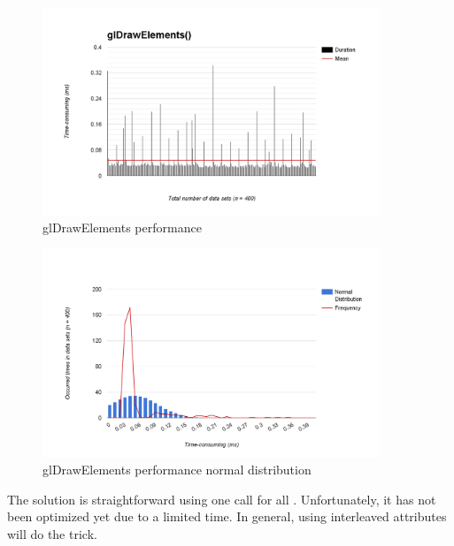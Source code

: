 \begin{figure}[H]
	\caption{glDrawElements performance}
	\label{fig:glDrawElements-performance}
	\centering
	\includegraphics[width=0.9\textwidth, keepaspectratio]{Figures/glDrawElements-performance.png}
	\decoRule
\end{figure}

\begin{figure}[H]
	\caption{glDrawElements performance normal distribution}
	\label{fig:glDrawElements-performance-normal-distribution}
	\centering
	\includegraphics[width=0.9\textwidth, keepaspectratio]{Figures/glDrawElements-performance-normal-distribution.png}
	\decoRule
\end{figure}

The solution is straightforward using one  call for all . Unfortunately, it has not been optimized yet due to a limited time. In general, using interleaved attributes will do the trick.

